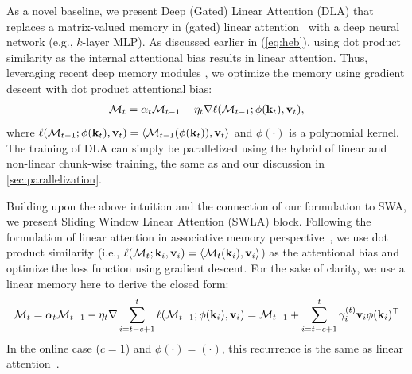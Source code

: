 As a novel baseline, we present Deep (Gated) Linear Attention (DLA) that replaces a matrix-valued memory in (gated) linear attention~\citep{katharopoulos2020transformers, yang2024gatedattn} with a deep neural network (e.g., $k$-layer MLP). As discussed earlier in (\ref{eq:heb}), using dot product similarity as the internal attentional bias results in linear attention. Thus, leveraging recent deep memory modules \citep{sun2024learning, behrouz2024titans, behrouz2025Miras}, we optimize the memory using gradient descent with dot product attentional bias:
\begin{align}\label{eq:DLA}
    \mathcal{M}_t = \alpha_t \mathcal{M}_{t-1} -  \eta_t  \nabla \ell(\mathcal{M}_{t-1}; \phi(\mathbf{k}_t), \mathbf{v}_t),
\end{align}
where $\ell(\mathcal{M}_{t-1}; \phi(\mathbf{k}_t), \mathbf{v}_t) = \langle \mathcal{M}_{t-1}(\phi(\mathbf{k}_t)), \mathbf{v}_t \rangle$ and $\phi(\cdot)$ is a polynomial kernel. The training of DLA can simply be parallelized using the hybrid of linear and non-linear chunk-wise training, the same as \citet{sun2024learning, behrouz2024titans} and our discussion in \autoref{sec:parallelization}.



Building upon the above intuition and the connection of our formulation to SWA, we present Sliding Window Linear Attention (SWLA) block. Following the formulation of linear attention in associative memory perspective~\citep{behrouz2025Miras}, we use dot product similarity (i.e., $\ell(\mathcal{M}_t; \mathbf{k}_i, \mathbf{v}_i) = \langle \mathcal{M}_t(\mathbf{k}_i), \mathbf{v}_i \rangle$) as the attentional bias and optimize the loss function using gradient descent. For the sake of clarity, we use a linear memory here to derive the closed form:
\begin{align}
    \mathcal{M}_t = \alpha_t\mathcal{M}_{t-1} - \eta_t \nabla \sum_{i = t - c + 1}^{t} \ell(\mathcal{M}_{t-1}; \phi(\mathbf{k}_i), \mathbf{v}_i) = \mathcal{M}_{t-1} +  \sum_{i = t - c + 1}^{t} \gamma^{(t)}_i \mathbf{v}_i \phi(\mathbf{k}_i)^{\top}
\end{align}
In the online case ($c=1$) and $\phi(\cdot) = (\cdot)$, this recurrence is the same as linear attention~\citep{katharopoulos2020transformers}. 









